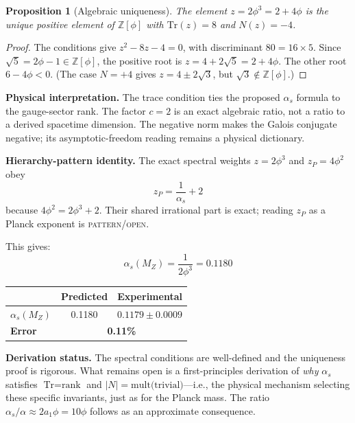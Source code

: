 \documentclass[12pt,a4paper]{article}
\newtheorem{proposition}{Proposition}
\theoremstyle{definition}
\begin{document}
\begin{proposition}[Algebraic uniqueness]
The element $z = 2\phi^3 = 2 + 4\phi$ is the unique positive element of $\mathbb{Z}[\phi]$ with $\mathrm{Tr}(z) = 8$ and $N(z) = -4$.
\end{proposition}

\begin{proof}
The conditions give $z^2 - 8z - 4 = 0$, with discriminant $80 = 16 \times 5$.  Since $\sqrt{5} = 2\phi-1 \in \mathbb{Z}[\phi]$, the positive root is $z = 4 + 2\sqrt{5} = 2 + 4\phi$.  The other root $6 - 4\phi < 0$.  (The case $N = +4$ gives $z = 4 \pm 2\sqrt{3}$, but $\sqrt{3} \notin \mathbb{Z}[\phi]$.)
\end{proof}

\textbf{Physical interpretation.} The trace condition ties the proposed $\alpha_s$ formula to the gauge-sector rank.  The factor $c=2$ is an exact algebraic ratio, not a ratio to a derived spacetime dimension.  The negative norm makes the Galois conjugate negative; its asymptotic-freedom reading remains a physical dictionary.

\textbf{Hierarchy-pattern identity.}  The exact spectral weights $z=2\phi^3$ and $z_P=4\phi^2$ obey
\begin{equation}
\boxed{z_P = \frac{1}{\alpha_s} + 2}
\label{eq:hierarchy_identity}
\end{equation}
because $4\phi^2=2\phi^3+2$.  Their shared irrational part is exact; reading $z_P$ as a Planck exponent is \textsc{pattern/open}.

This gives:
\begin{equation}
\boxed{\alpha_s(M_Z) = \frac{1}{2\phi^3} = 0.1180}
\label{eq:alpha_s}
\end{equation}
\begin{center}
\begin{tabular}{lcc}
\toprule
& \textbf{Predicted} & \textbf{Experimental} \\
\midrule
$\alpha_s(M_Z)$ & 0.1180 & $0.1179 \pm 0.0009$ \\
\textbf{Error} & \multicolumn{2}{c}{\textbf{0.11\%}} \\
\bottomrule
\end{tabular}
\end{center}

\textbf{Derivation status.} The spectral conditions are well-defined and the uniqueness proof is rigorous. What remains open is a first-principles derivation of \emph{why} $\alpha_s$ satisfies $\text{Tr} = \text{rank}$ and $|N| = \text{mult(trivial)}$---i.e., the physical mechanism selecting these specific invariants, just as for the Planck mass. The ratio $\alpha_s/\alpha \approx 2a_1\phi = 10\phi$ follows as an approximate consequence.
\end{document}
